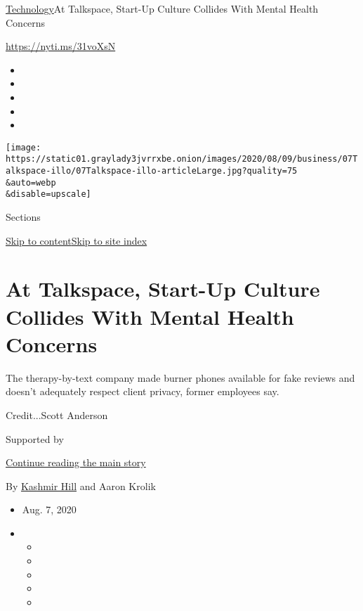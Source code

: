 \href{/section/technology}{Technology}\textbar{}At Talkspace, Start-Up
Culture Collides With Mental Health Concerns

\url{https://nyti.ms/31voXsN}

\begin{itemize}
\item
\item
\item
\item
\item
\end{itemize}

\texttt{[image: https://static01.graylady3jvrrxbe.onion/images/2020/08/09/business/07Talkspace-illo/07Talkspace-illo-articleLarge.jpg?quality=75\\\&auto=webp\\\&disable=upscale]}

Sections

\protect\hyperlink{site-content}{Skip to
content}\protect\hyperlink{site-index}{Skip to site index}

\hypertarget{at-talkspace-start-up-culture-collides-with-mental-health-concerns}{%
\section{At Talkspace, Start-Up Culture Collides With Mental Health
Concerns}\label{at-talkspace-start-up-culture-collides-with-mental-health-concerns}}

The therapy-by-text company made burner phones available for fake
reviews and doesn't adequately respect client privacy, former employees
say.

Credit...Scott Anderson

Supported by

\protect\hyperlink{after-sponsor}{Continue reading the main story}

By \href{https://www.nytimes3xbfgragh.onion/by/kashmir-hill}{Kashmir
Hill} and Aaron Krolik

\begin{itemize}
\item
  Aug. 7, 2020
\item
  \begin{itemize}
  \item
  \item
  \item
  \item
  \item
  \end{itemize}
\end{itemize}

